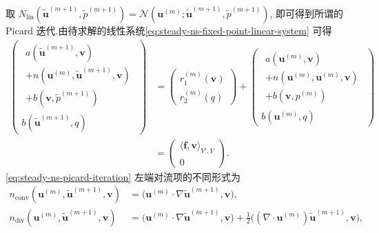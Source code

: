\begin{note}[Picard 迭代]\label{note:steady-ns-picard-iteration}
取
$N_{\mathrm{lin}}(\widetilde{\bm{u}}^{(m+1)},\widetilde p^{(m+1)})
=\mathcal{N}(\bm{u}^{(m)};\widetilde{\bm{u}}^{(m+1)},\widetilde p^{(m+1)})$,
即可得到所谓的 Picard 迭代.由待求解的线性系统\cref{eq:steady-ns-fixed-point-linear-system} 可得
\begin{equation}\label{eq:steady-ns-picard-iteration}
\begin{aligned}
  \begin{pmatrix}
    \begin{gathered}
      a(\widetilde{\bm{u}}^{(m+1)},\bm{v})\\
      +n(\bm{u}^{(m)},\widetilde{\bm{u}}^{(m+1)},\bm{v})\\
      +b(\bm{v},\widetilde p^{(m+1)})
    \end{gathered}\\
    b(\widetilde{\bm{u}}^{(m+1)},q)
  \end{pmatrix}
  &=
  \begin{pmatrix}
    r_1^{(m)}(\bm{v})\\r_2^{(m)}(q)
  \end{pmatrix}
  +
  \begin{pmatrix}
    \begin{gathered}
      a(\bm{u}^{(m)},\bm{v})\\
      +n(\bm{u}^{(m)},\bm{u}^{(m)},\bm{v})\\
      +b(\bm{v},p^{(m)})
    \end{gathered}\\
    b(\bm{u}^{(m)},q)
  \end{pmatrix}\\
  &=
  \begin{pmatrix}
    \langle\bm{f},\bm{v}\rangle_{V',V}\\0
  \end{pmatrix}.
\end{aligned}
\end{equation}
\cref{eq:steady-ns-picard-iteration} 左端对流项的不同形式为
\[
\begin{aligned}
  n_{\mathrm{conv}}(\bm{u}^{(m)},\widetilde{\bm{u}}^{(m+1)},\bm{v})
    &=\bigl(\bm{u}^{(m)}\cdot\nabla
              \widetilde{\bm{u}}^{(m+1)},\bm{v}\bigr),\\
  n_{\mathrm{div}}(\bm{u}^{(m)},\widetilde{\bm{u}}^{(m+1)},\bm{v})
    &=\bigl(\bm{u}^{(m)}\cdot\nabla
              \widetilde{\bm{u}}^{(m+1)},\bm{v}\bigr)
      +\frac12\bigl((\nabla\cdot\bm{u}^{(m)})
              \widetilde{\bm{u}}^{(m+1)},\bm{v}\bigr),\\

\end{aligned}\]
\end{note}
